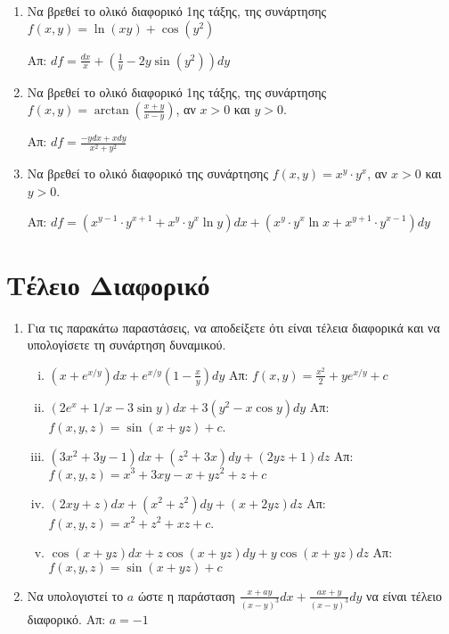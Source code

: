 \begin{enumerate}
  \item Να βρεθεί το ολικό διαφορικό 1ης τάξης, της συνάρτησης 
    $f(x,y)=\ln(xy)+\cos(y^2)$ 

    \hfill Απ: $df=\frac{dx}{x}+\left(\frac{1}{y}-2y\sin(y^2)\right)dy$

  \item Να βρεθεί το ολικό διαφορικό 1ης τάξης, της συνάρτησης 
    $ f(x,y) = \arctan(\frac{ x+y }{ x-y }) $, αν $ x>0 $ και $ y>0 $.

    \hfill Απ: $df = \frac{ -ydx + xdy }{ x^{2} + y^{2} } $ 

  \item Να βρεθεί το ολικό διαφορικό της συνάρτησης $ f(x,y) = x^{y} \cdot y^{x} $, 
    αν $ x>0$ και $ y>0 $.

    \hfill Απ: $df =  (x^{y-1}\cdot y^{x+1} + x^{y}\cdot y^{x} \ln{y} )dx 
    + (x^{y}\cdot y^{x} \ln{x} + x^{y+1} \cdot y^{x-1})dy $ 

\end{enumerate}

\section*{Τέλειο Διαφορικό}
\begin{enumerate}
  \item Για τις παρακάτω παραστάσεις, να αποδείξετε ότι είναι τέλεια διαφορικά και 
    να υπολογίσετε τη συνάρτηση δυναμικού.
    \begin{enumerate}[i)]
      \item $ \left(x+e^{x/y}\right)dx + e^{x/y}\left(1- \frac{x}{y}\right)dy $
        \hfill Απ: $ f(x,y) = \frac{x^{2}}{2} +y e^{x/y} + c $ 

      \item $\left(2e^{x}+{1}/{x}-3\sin y\right)dx+3(y^2-x\cos y)dy$ 
        \hfill  Απ: $ f(x,y,z) = \sin{(x+yz)} +c $.
      \item $ (3x^{2}+3y-1)dx + (z^{2}+3x)dy+(2yz+1)dz $
        \hfill Απ: $ f(x,y,z) = x^{3}+3xy-x+yz^{2}+z+c $

      \item $(2xy+z)dx+(x^{2}+z^{2})dy+(x+2yz)dz$ 
        \hfill  Απ: $ f(x,y,z) = x^{2}+z^{2}+xz +c $.

      \item $ \cos(x+yz)dx + z\cos(x+yz)dy+y\cos(x+yz)dz $
        \hfill Απ: $ f(x,y,z) = \sin(x+yz) + c $

    \end{enumerate}

  \item Να υπολογιστεί το $a$ ώστε η παράσταση $ \frac{ x + ay }{ (x-y)^{3} }dx 
    + \frac{ ax+y }{ (x-y)^{3} }dy $ να είναι τέλειο διαφορικό.
    \hfill Απ: $ a=-1 $

\end{enumerate}

